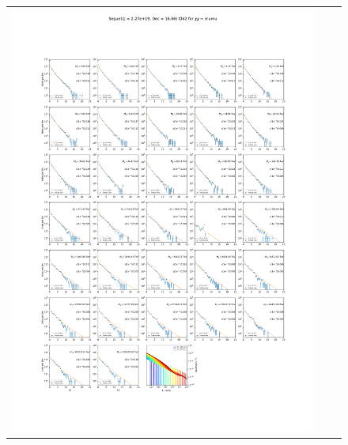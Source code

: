 \begin{figure}[!hb]
{\begin{tabular}{ccc}
            \includegraphics[clip, trim=22.1cm 6.5cm 19.5cm 56.5cm, scale=0.55]{figures/ic_DM/dm_plots/Segue1_mumu_chi2_Masspanel_2024-03-23.pdf} &

\end{tabular}}
\end{figure}
